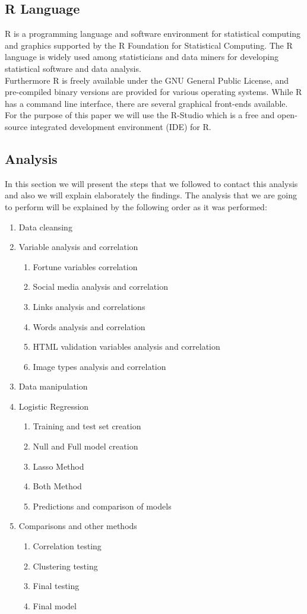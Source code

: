 \documentclass{article}
\begin{document}
\subsection{R Language}
R is a programming language and software environment for statistical computing and graphics supported by the R Foundation for Statistical Computing. The R language is widely used among statisticians and data miners for developing statistical software and data analysis.\\ 
Furthermore R is freely available under the GNU General Public License, and pre-compiled binary versions are provided for various operating systems. While R has a command line interface, there are several graphical front-ends available.\\
For the purpose of this paper we will use the R-Studio which  is a free and open-source integrated development environment (IDE) for R.
\subsection{Analysis}
In this section we will present the steps that we followed to contact this analysis and also we will explain elaborately the findings. The analysis that we are going to perform will be explained by the following order as it was performed:
\begin{enumerate}
\item Data cleansing
\item Variable analysis and correlation
\begin{enumerate}
\item Fortune variables correlation
\item Social media analysis and correlation
\item Links analysis and correlations
\item Words analysis and correlation
\item HTML validation variables analysis and correlation
\item Image types analysis and correlation
\end{enumerate}
\item Data manipulation
\item Logistic Regression
\begin{enumerate}
\item Training and test set creation
\item Null and Full model creation
\item Lasso Method
\item Both Method
\item Predictions and comparison of models
\end{enumerate}
\item Comparisons and other methods
\begin{enumerate}
\item Correlation testing
\item Clustering testing
\item Final testing
\item Final model
\end{enumerate}
\end{enumerate}
\end{document}
